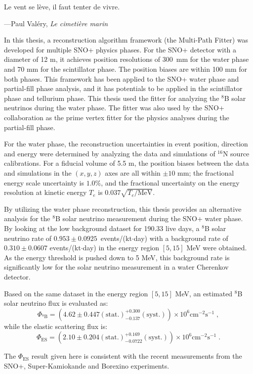 \epigraph{Le vent se l\`{e}ve, il faut tenter de vivre.}{---\textup{Paul Val\'{e}ry, \textit{Le cimeti\`{e}re marin}}}

In this thesis, a reconstruction algorithm framework (the Multi-Path Fitter) was developed for multiple SNO+ physics phases. For the SNO+ detector with a diameter of 12 m, it achieves position resolutions of 300~mm for the water phase and 70 mm for the scintillator phase. The position biases are within 100 mm for both phases. This framework has been applied to the SNO+ water phase and partial-fill phase analysis, and it has potentials to be applied in the scintillator phase and tellurium phase. This thesis used the fitter for analyzing the $^8$B solar neutrinos during the water phase. The fitter was also used by the SNO+ collaboration as the prime vertex fitter for the physics analyses during the partial-fill phase.

For the water phase, the reconstruction uncertainties in event position, direction and energy were determined by analyzing the data and simulations of $^{16}$N source calibrations. For a fiducial volume of 5.5 m, the position biases between the data and simulations in the $(x,y,z)$ axes are all within $\pm10$ mm; the fractional energy scale uncertainty is $1.0$\%, and the fractional uncertainty on the energy resolution at kinetic energy $T_e$ is $0.037\sqrt{T_e/\mathrm{MeV}}$.

By utilizing the water phase reconstruction, this thesis provides an alternative analysis for the $^8$B solar neutrino measurement during the SNO+ water phase. By looking at the low background dataset for 190.33 live days, a $^8$B solar neutrino rate of $0.953\pm0.0925$~events/(kt$\cdot$day) with a background rate of $0.310\pm 0.0607$ events/(kt$\cdot$day) in the energy region $[5,15]$ MeV were obtained. As the energy threshold is pushed down to 5 MeV, this background rate is significantly low for the solar neutrino measurement in a water Cherenkov detector.

Based on the same dataset in the energy region $[5,15]$ MeV, an estimated $^8$B solar neutrino flux is evaluated as: 
\begin{equation*}
\Phi_{\mathrm{^8B}}=(4.62 \pm 0.447 \mathrm{(stat.)}^{+0.300}_{-0.137}\mathrm{(syst.)})\times 10^6 \mathrm{cm}^{-2}\mathrm{s}^{-1}\;, 
\end{equation*}
while the elastic scattering flux is:
\begin{equation*}
\Phi_{\mathrm{ES}}=(2.10 \pm 0.204\mathrm{(stat.)}^{+0.169}_{-0.0722}\mathrm{(syst.)})\times 10^6 \mathrm{cm}^{-2}\mathrm{s}^{-1}\;.
\end{equation*}

The $\Phi_{\mathrm{ES}}$ result given here is consistent with the recent measurements from the SNO+, Super-Kamiokande and Borexino experiments.